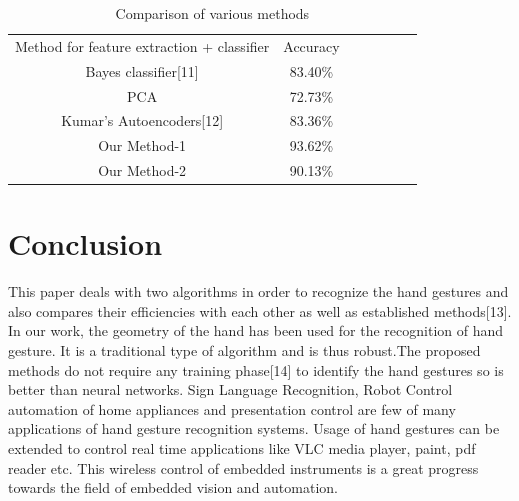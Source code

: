 \documentclass[conference]{IEEEtran}
\begin{document}
%
%
%

\begin{table}[h!]
\caption{Comparison of various methods}
\begin{center}
\begin{tabular}{|c|c|c|c|c|c|c|}
\hline
\multicolumn{1}{|c|}{Method for feature extraction + classifier}
& \multicolumn{1}{|c|}{Accuracy}\\
Bayes classifier[11] & 83.40\% \\ \hline
PCA & 72.73\% \\ \hline
Kumar's Autoencoders[12] & 83.36\% \\ \hline
Our Method-1 & 93.62\% \\ \hline
Our Method-2 & 90.13\% \\ \hline
\end{tabular}
\label{table-tab2}
\end{center}
\end{table}


\section{Conclusion}
This paper deals with two algorithms in order to recognize the hand gestures and also compares their efficiencies with each other as well as established methods[13]. In our work, the geometry of the hand has been used for the recognition of hand gesture. It is a traditional type of algorithm and is thus robust.The proposed methods do not require any training phase[14] to identify the hand gestures so is better than neural networks. Sign Language Recognition, Robot Control automation of home appliances and presentation control are few of many applications of hand gesture recognition systems. Usage of hand gestures can be extended to control real time applications like VLC media player, paint, pdf reader etc. This wireless control of embedded instruments is a great progress towards the field of embedded vision and automation.\cite{1199054}



 
\end{document}
